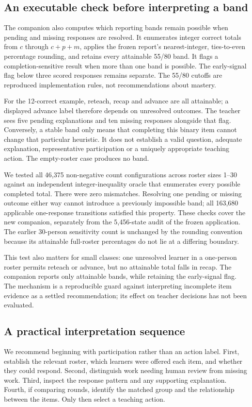 \subsection{An executable check before interpreting a band}
The companion also computes which reporting bands remain possible when pending and missing responses are resolved. It enumerates integer correct totals from $c$ through $c+p+m$, applies the frozen report's nearest-integer, ties-to-even percentage rounding, and retains every attainable 55/80 band. It flags a completion-sensitive result when more than one band is possible. The early-signal flag below three scored responses remains separate. The 55/80 cutoffs are reproduced implementation rules, not recommendations about mastery.

For the 12-correct example, reteach, recap and advance are all attainable; a displayed advance label therefore depends on unresolved outcomes. The teacher sees five pending explanations and ten missing responses alongside that flag. Conversely, a stable band only means that completing this binary item cannot change that particular heuristic. It does not establish a valid question, adequate explanation, representative participation or a uniquely appropriate teaching action. The empty-roster case produces no band.

We tested all 46,375 non-negative count configurations across roster sizes 1--30 against an independent integer-inequality oracle that enumerates every possible completed total. There were zero mismatches. Resolving one pending or missing outcome either way cannot introduce a previously impossible band; all 163,680 applicable one-response transitions satisfied this property. These checks cover the new companion, separately from the 5,456-state audit of the frozen application. The earlier 30-person sensitivity count is unchanged by the rounding convention because its attainable full-roster percentages do not lie at a differing boundary.

This test also matters for small classes: one unresolved learner in a one-person roster permits reteach or advance, but no attainable total falls in recap. The companion reports only attainable bands, while retaining the early-signal flag. The mechanism is a reproducible guard against interpreting incomplete item evidence as a settled recommendation; its effect on teacher decisions has not been evaluated.

\subsection{A practical interpretation sequence}
We recommend beginning with participation rather than an action label. First, establish the relevant roster, which learners were offered each item, and whether they could respond. Second, distinguish work needing human review from missing work. Third, inspect the response pattern and any supporting explanation. Fourth, if comparing rounds, identify the matched group and the relationship between the items. Only then select a teaching action.

